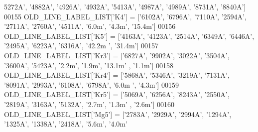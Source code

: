 \begin{DoxyCode}
{{{      5272A'}, \textcolor{stringliteral}{'4882A'}, \textcolor{stringliteral}{'4926A'}, \textcolor{stringliteral}{'4932A'}, \textcolor{stringliteral}{'5413A'}, \textcolor{stringliteral}{'4987A'}, \textcolor{stringliteral}{'4989A'}, \textcolor{stringliteral}{'8731A'}, \textcolor{stringliteral}{'8840A'}]
00155 OLD\_LINE\_LABEL\_LIST[\textcolor{stringliteral}{'K4'}] = [\textcolor{stringliteral}{'6102A'}, \textcolor{stringliteral}{'6796A'}, \textcolor{stringliteral}{'7110A'}, \textcolor{stringliteral}{'2594A'}, \textcolor{stringliteral}{'2711A'}, \textcolor{stringliteral}{'2760A'}, \textcolor{stringliteral}{'4511A'}, \textcolor{stringliteral}{'6.0m'}, \textcolor{stringliteral}{'4.3m'},
       \textcolor{stringliteral}{'15.4m'}]
00156 OLD\_LINE\_LABEL\_LIST[\textcolor{stringliteral}{'K5'}] = [\textcolor{stringliteral}{'4163A'}, \textcolor{stringliteral}{'4123A'}, \textcolor{stringliteral}{'2514A'}, \textcolor{stringliteral}{'6349A'}, \textcolor{stringliteral}{'6446A'}, \textcolor{stringliteral}{'2495A'}, \textcolor{stringliteral}{'6223A'}, \textcolor{stringliteral}{'6316A'}, \textcolor{stringliteral}{'42.2m
      '}, \textcolor{stringliteral}{'31.4m'}]
00157 OLD\_LINE\_LABEL\_LIST[\textcolor{stringliteral}{'Kr3'}] = [\textcolor{stringliteral}{'6827A'}, \textcolor{stringliteral}{'9902A'}, \textcolor{stringliteral}{'3022A'}, \textcolor{stringliteral}{'3504A'}, \textcolor{stringliteral}{'3600A'}, \textcolor{stringliteral}{'5423A'}, \textcolor{stringliteral}{'2.2m'}, \textcolor{stringliteral}{'1.9m'}, \textcolor{stringliteral}{'13.1m'}
      , \textcolor{stringliteral}{'1.1m'}]
00158 OLD\_LINE\_LABEL\_LIST[\textcolor{stringliteral}{'Kr4'}] = [\textcolor{stringliteral}{'5868A'}, \textcolor{stringliteral}{'5346A'}, \textcolor{stringliteral}{'3219A'}, \textcolor{stringliteral}{'7131A'}, \textcolor{stringliteral}{'8091A'}, \textcolor{stringliteral}{'2993A'}, \textcolor{stringliteral}{'6108A'}, \textcolor{stringliteral}{'6798A'}, \textcolor{stringliteral}{'6.0m
      '}, \textcolor{stringliteral}{'4.3m'}]
00159 OLD\_LINE\_LABEL\_LIST[\textcolor{stringliteral}{'Kr5'}] = [\textcolor{stringliteral}{'5069A'}, \textcolor{stringliteral}{'6256A'}, \textcolor{stringliteral}{'8243A'}, \textcolor{stringliteral}{'2550A'}, \textcolor{stringliteral}{'2819A'}, \textcolor{stringliteral}{'3163A'}, \textcolor{stringliteral}{'5132A'}, \textcolor{stringliteral}{'2.7m'}, \textcolor{stringliteral}{'1.3m'}
      , \textcolor{stringliteral}{'2.6m'}]
00160 OLD\_LINE\_LABEL\_LIST[\textcolor{stringliteral}{'Mg5'}] = [\textcolor{stringliteral}{'2783A'}, \textcolor{stringliteral}{'2929A'}, \textcolor{stringliteral}{'2994A'}, \textcolor{stringliteral}{'1294A'}, \textcolor{stringliteral}{'1325A'}, \textcolor{stringliteral}{'1338A'}, \textcolor{stringliteral}{'2418A'}, \textcolor{stringliteral}{'5.6m'}, \textcolor{stringliteral}{'4.0m'}
}}
\end{DoxyCode}
